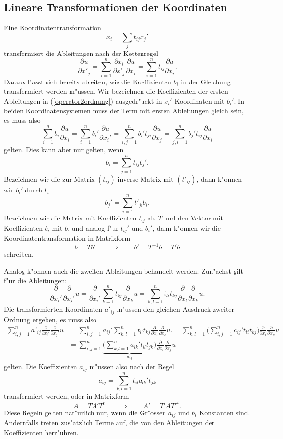 \subsection{Lineare Transformationen der Koordinaten
\label{lineare-transformation}}
Eine Koordinatentransformation
\[
x_i=\sum_{j}t_{ij}x_j'
\]
transformiert die Ableitungen nach der Kettenregel
\[
\frac{\partial u}{\partial x'_j}
=
\sum_{i=1}^n
\frac{\partial x_i}{\partial x'_j} \frac{\partial u}{\partial x_i}
=
\sum_{i=1}^nt_{ij}\frac{\partial u}{\partial x_i}.
\]
Daraus l"asst sich bereits ableiten, wie die Koeffizienten $b_i$ in der
Gleichung transformiert werden m"ussen.
Wir bezeichnen die Koeffizienten der ersten Ableitungen in
(\ref{operator2ordnung}) ausgedr"uckt in $x_i'$-Koordinaten mit
$b_i'$.
In beiden Koordinatensystemen muss der Term mit ersten Ableitungen gleich
sein, es muss also
\[
\sum_{i=1}^n b_i\frac{\partial u}{\partial x_i}
=
\sum_{i=1}^n b_i'\frac{\partial u}{\partial x_i'}
=
\sum_{i,j=1}^n b_i't_{ji}\frac{\partial u}{\partial x_j}
=
\sum_{j,i=1}^n b_j't_{ij}\frac{\partial u}{\partial x_i}
\]
gelten.
Dies kann aber nur gelten, wenn
\[
b_i = \sum_{j=1}^n t_{ij}b_j'.
\]
Bezeichnen wir die zur Matrix $(t_{ij})$ inverse Matrix mit $(t'_{ij})$,
dann k"onnen wir $b_i'$ durch $b_i$ 
\[
b_j'=\sum_{i=1}^n t'_{ji}b_i.
\]
Bezeichnen wir die Matrix mit Koeffizienten $t_{ij}$ als $T$ und den 
Vektor mit Koeffizienten $b_i$ mit $b$, und analog f"ur $t_{ij}'$ und
$b_i'$, dann k"onnen wir die Koordinatentransformation in Matrixform
\[
b=Tb'
\qquad\Rightarrow\qquad
b'=T^{-1}b=T'b
\]
schreiben.

Analog k"onnen auch die zweiten Ableitungen behandelt werden.
Zun"achst gilt f"ur die Ableitungen:
\[
\frac{\partial}{\partial x_i'}\frac{\partial}{\partial x_j'} u
=
\frac{\partial}{\partial x_i'}
\sum_{k=1}^nt_{kj}\frac{\partial}{\partial x_k}u
=
\sum_{k,l=1}^nt_{li}t_{kj}\frac{\partial}{\partial x_l}\frac{\partial}{\partial x_k}u.
\]
Die transformierten Koordinaten $a'_{ij}$ m"ussen den gleichen Ausdruck
zweiter Ordnung ergeben, es muss also
\begin{align*}
\sum_{i,j=1}^n
a'_{ij}\frac{\partial}{\partial x_i'}\frac{\partial}{\partial x_j'} u
&=
\sum_{i,j=1}^n
a_{ij}'
\sum_{k,l=1}^n
t_{li}t_{kj}\frac{\partial}{\partial x_l}\frac{\partial}{\partial x_k}u.
=
\sum_{k,l=1}^n
\biggl(
\sum_{i,j=1}^n
a_{ij}'
t_{li}t_{kj}
\biggr)
\frac{\partial}{\partial x_l}\frac{\partial}{\partial x_k}u
\\
&=
\sum_{i,j=1}^n
\underbrace{
\biggl(
\sum_{k,l=1}^n
a_{lk}'
t_{il}t_{jk}
\biggr)}_{\textstyle a_{ij}}
\frac{\partial}{\partial x_i}\frac{\partial}{\partial x_j}u
\end{align*}
gelten.
Die Koeffizienten $a_{ij}$ m"ussen also nach der Regel
\[
a_{ij}=\sum_{k,l=1}^n t_{il}a_{lk}'t_{jk}
\]
transformiert werden, oder in Matrixform
\[
A=TA'T^t
\qquad\Rightarrow\qquad
A'=T'AT'^t.
\]
Diese Regeln gelten nat"urlich nur, wenn die Gr"ossen $a_{ij}$ und $b_i$
Konstanten sind.
Andernfalls treten zus"atzlich Terme auf, die von den Ableitungen der
Koeffizienten herr"uhren.

